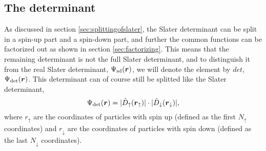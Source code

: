 \subsection{The determinant} \label{sec:slaterdeterminant}
As discussed in section \ref{sec:splittingofslater}, the Slater determinant can be split in a spin-up part and a spin-down part, and further the common functions can be factorized out as shown in section \ref{sec:factorizing}. This means that the remaining determinant is not the full Slater determinant, and to distinguish it from the real Slater determinant, $\Psi_{\text{sd}}(\boldsymbol{{r}})$, we will denote the element by $det$, $\Psi_{\text{det}}(\boldsymbol{{r}})$. This determinant can of course still be splitted like the Slater determinant, 
\begin{equation}
\Psi_{\text{det}}(\boldsymbol{{r}})=
|\hat{D}_{\uparrow}(\boldsymbol{{r}}_{\uparrow})|\cdot |\hat{D}_{\downarrow}(\boldsymbol{{r}}_{\downarrow})|,
\end{equation}
where $r_{\uparrow}$ are the coordinates of particles with spin up (defined as the first $N_{\uparrow}$ coordinates) and $r_{\downarrow}$ are the coordinates of particles with spin down (defined as the last $N_{\downarrow}$ coordinates). 

